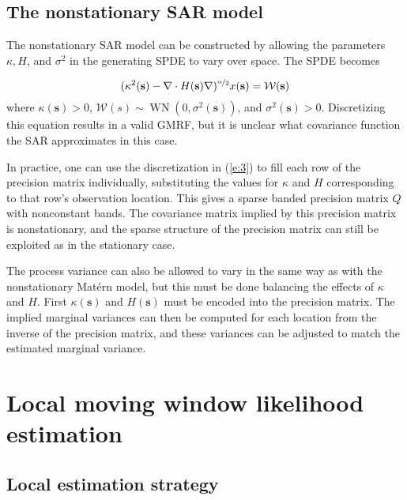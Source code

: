 \documentclass[review]{elsarticle}
\begin{document}
\subsection{The nonstationary SAR model}

The nonstationary SAR model can be constructed by allowing the parameters $\kappa, H$, and $\sigma^2$ in the generating SPDE to vary over space. The SPDE becomes

$$ (\kappa^2(\mathbf s) - \nabla \cdot H(\mathbf s) \nabla)^{\nicefrac{\alpha}{2}} x(\mathbf s) = \mathcal{W}(\mathbf s) $$
where $\kappa(\mathbf s) > 0$, $\mathcal{W}(s) \sim \operatorname{WN}(0, \sigma^2(\mathbf s))$, and $\sigma^2(\mathbf s) > 0$. Discretizing this equation results in a valid GMRF, but it is unclear what covariance function the SAR approximates in this case.

In practice, one can use the discretization in (\ref{e:3}) to fill each row of the precision matrix individually, substituting the values for $\kappa$ and $H$ corresponding to that row's observation location. This gives a sparse banded precision matrix $Q$ with nonconstant bands. The covariance matrix implied by this precision matrix is nonstationary, and the sparse structure of the precision matrix can still be exploited as in the stationary case.

The process variance can also be allowed to vary in the same way as with the nonstationary Mat\'ern model, but this must be done balancing the effects of $\kappa$ and $H$. First $\kappa(\mathbf s)$ and $H(\mathbf s)$ must be encoded into the precision matrix. The implied marginal variances can then be computed for each location from the inverse of the precision matrix, and these variances can be adjusted to match the estimated marginal variance. 















\section{Local moving window likelihood estimation}


\subsection{Local estimation strategy}
\end{document}
